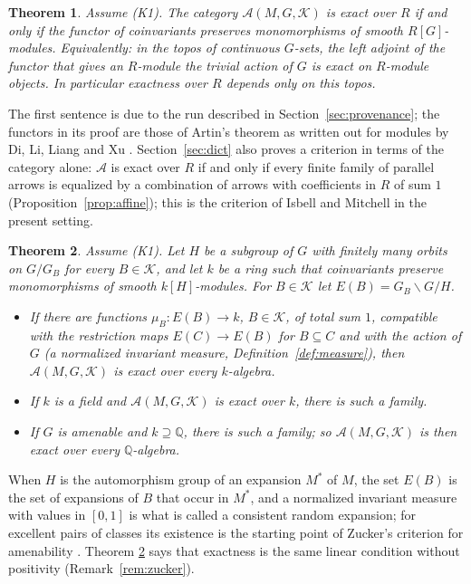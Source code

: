 \documentclass[11pt,a4paper]{article}
\newtheorem{theorem}{Theorem}[section]
\theoremstyle{definition}
\newcommand{\A}{\mathcal{A}}
\newcommand{\K}{\mathcal{K}}
\newcommand{\Q}{\mathbb{Q}}
\begin{document}
\begin{theorem}\label{thm:dict}
Assume \textup{(K1)}. The category $\A(M,G,\K)$ is exact over $R$ if and only
if the functor of coinvariants preserves monomorphisms of smooth
$R[G]$-modules. Equivalently: in the topos of continuous $G$-sets, the left
adjoint of the functor that gives an $R$-module the trivial action of $G$ is
exact on $R$-module objects. In particular exactness over $R$ depends only
on this topos.
\end{theorem}

The first sentence is due to the run described in
Section~\ref{sec:provenance}; the functors in its proof are those of Artin's
theorem as written out for modules by Di, Li, Liang and Xu
\cite[Theorem~5.1]{DLLX}. Section~\ref{sec:dict} also proves a criterion in
terms of the category alone: $\A$ is exact over $R$ if and only if every
finite family of parallel arrows is equalized by a combination of arrows
with coefficients in $R$ of sum $1$ (Proposition~\ref{prop:affine}); this is
the criterion of Isbell and Mitchell \cite{IM} in the present setting.

\begin{theorem}\label{thm:transfer}
Assume \textup{(K1)}. Let $H$ be a subgroup of $G$ with finitely many orbits
on $G/G_B$ for every $B\in\K$, and let $k$ be a ring such that coinvariants
preserve monomorphisms of smooth $k[H]$-modules. For $B\in\K$ let
$E(B)=G_B\backslash G/H$.
\begin{itemize}
\item[\textup{(a)}] If there are functions $\mu_B\colon E(B)\to k$, $B\in\K$,
of total sum $1$, compatible with the restriction maps $E(C)\to E(B)$ for
$B\subseteq C$ and with the action of $G$ \textup{(}a \emph{normalized
invariant measure}, Definition~\textup{\ref{def:measure})}, then
$\A(M,G,\K)$ is exact over every $k$-algebra.
\item[\textup{(b)}] If $k$ is a field and $\A(M,G,\K)$ is exact over $k$,
there is such a family.
\item[\textup{(c)}] If $G$ is amenable and $k\supseteq\Q$, there is such a
family; so $\A(M,G,\K)$ is then exact over every $\Q$-algebra.
\end{itemize}
\end{theorem}

When $H$ is the automorphism group of an expansion $M^*$ of $M$, the set
$E(B)$ is the set of expansions of $B$ that occur in $M^*$, and a normalized
invariant measure with values in $[0,1]$ is what is called a consistent
random expansion; for excellent pairs of classes its existence is the
starting point of Zucker's criterion for amenability
\cite[\S3 and Theorem~3.1]{Zu}. Theorem
\ref{thm:transfer} says that exactness is the same linear condition without
positivity (Remark~\ref{rem:zucker}).
\end{document}
